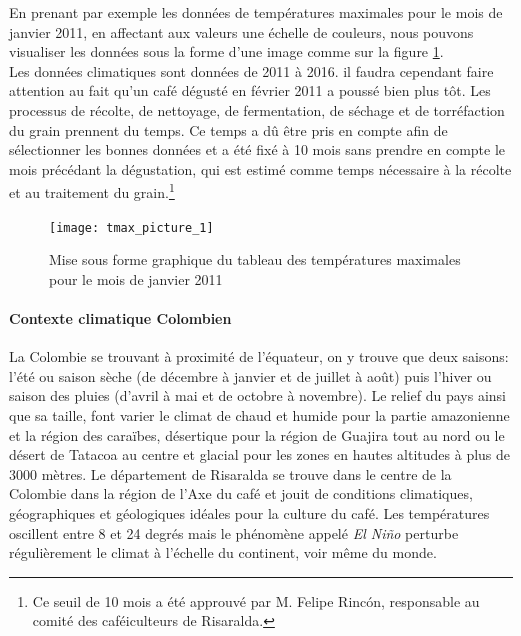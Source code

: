 \noindent En prenant par exemple les données de températures maximales pour le mois de janvier 2011, en affectant aux valeurs une échelle de couleurs, nous pouvons visualiser les données sous la forme d'une image comme sur la figure \ref{tmax_picture}.\\

\noindent Les données climatiques sont données de 2011 à 2016. il faudra cependant faire attention au fait qu'un café dégusté en février 2011 a poussé bien plus tôt. Les processus de récolte, de nettoyage, de fermentation, de séchage et de torréfaction du grain prennent du temps. Ce temps a dû être pris en compte afin de sélectionner les bonnes données et a été fixé à 10 mois sans prendre en compte le mois précédant la dégustation, qui est estimé comme temps nécessaire à la récolte et au traitement du grain.\footnote{Ce seuil de 10 mois a été approuvé par M. Felipe Rincón, responsable au comité des caféiculteurs de Risaralda.} 


\begin{figure}[H]
	\centering
	\texttt{[image: tmax\_picture\_1]}
	\caption{\label{tmax_picture} Mise sous forme graphique du tableau des températures maximales pour le mois de janvier 2011 }
\end{figure}

\paragraph{Contexte climatique Colombien}La Colombie se trouvant à proximité de l'équateur, on y trouve que deux saisons: l'été ou saison sèche (de décembre à janvier et de juillet à août) puis l'hiver ou saison des pluies (d'avril à mai et de octobre à novembre). Le relief du pays ainsi que sa taille, font varier le climat de chaud et humide pour la partie amazonienne et la région des caraïbes, désertique pour la région de Guajira tout au nord ou le désert de Tatacoa au centre et glacial pour les zones en hautes altitudes à plus de 3000 mètres. Le département de Risaralda se trouve dans le centre de la Colombie dans la région de l'Axe du café et jouit de conditions climatiques, géographiques et géologiques idéales pour la culture du café.\cite{WikiCafeicultureColombie} \cite{IDEAM} \cite{WikiMeteo} Les températures oscillent entre 8 et 24 degrés mais le phénomène appelé \textit{El Niño} perturbe régulièrement le climat à l'échelle du continent, voir même du monde. 




